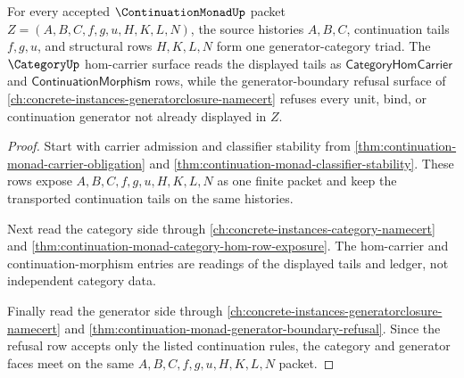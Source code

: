 \begin{theorem}
\label{thm:continuation-monad-generator-category-triad}
For every accepted $\ContinuationMonadUp$ packet $Z=(A,B,C,f,g,u,H,K,L,N)$, the source histories $A,B,C$, continuation tails $f,g,u$, and structural rows $H,K,L,N$ form one generator-category triad. The $\CategoryUp$ hom-carrier surface reads the displayed tails as $\mathsf{CategoryHomCarrier}$ and $\mathsf{ContinuationMorphism}$ rows, while the generator-boundary refusal surface of \autoref{ch:concrete-instances-generatorclosure-namecert} refuses every unit, bind, or continuation generator not already displayed in $Z$.
\end{theorem}
\begin{proof}
Start with carrier admission and classifier stability from \autoref{thm:continuation-monad-carrier-obligation} and \autoref{thm:continuation-monad-classifier-stability}. These rows expose $A,B,C,f,g,u,H,K,L,N$ as one finite packet and keep the transported continuation tails on the same histories.

Next read the category side through \autoref{ch:concrete-instances-category-namecert} and \autoref{thm:continuation-monad-category-hom-row-exposure}. The hom-carrier and continuation-morphism entries are readings of the displayed tails and ledger, not independent category data.

Finally read the generator side through \autoref{ch:concrete-instances-generatorclosure-namecert} and \autoref{thm:continuation-monad-generator-boundary-refusal}. Since the refusal row accepts only the listed continuation rules, the category and generator faces meet on the same $A,B,C,f,g,u,H,K,L,N$ packet.
\end{proof}

